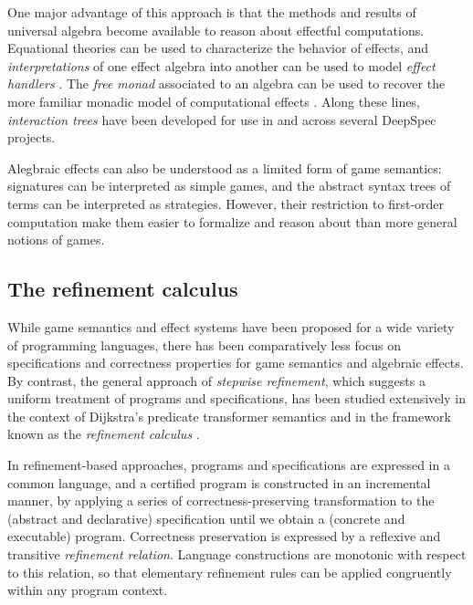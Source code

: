 \documentclass[11pt,oneside,draft]{book}
\theoremstyle{definition}
\begin{document}
One major advantage of this approach is that
the methods and results of universal algebra
become available to reason about effectful computations.
Equational theories can be used to characterize
the behavior of effects, and \emph{interpretations}
of one effect algebra into another can be used to model
\emph{effect handlers} \citep{eff}.
The \emph{free monad} associated to an algebra
can be used to recover the more familiar
monadic model of computational effects \citep{monads}.
Along these lines,
\emph{interaction trees} \citep{itree}
have been developed for use in and across
several DeepSpec projects.

Alegbraic effects can also be understood as
a limited form of game semantics:
signatures can be interpreted as simple games,
and the abstract syntax trees of terms
can be interpreted as strategies.
However,
their restriction to first-order computation
make them easier to formalize and reason about
than more general notions of games.



\subsection{The refinement calculus} %

While game semantics
and effect systems
have been proposed
for a wide variety of programming languages,
there has been comparatively less focus
on specifications and correctness properties
for game semantics and algebraic effects.
By contrast,
the general approach of \emph{stepwise refinement},
which suggests a uniform treatment of programs and specifications,
has been studied extensively in the context of
Dijkstra's predicate transformer semantics \citep{gc}
and in the framework known as the \emph{refinement calculus} \citep{refcal}.

In refinement-based approaches,
programs and specifications are expressed in a common language,
and a certified program is constructed in an incremental manner,
by applying a series of correctness-preserving transformation
to the (abstract and declarative) specification
until we obtain a (concrete and executable) program.
Correctness preservation is expressed
by a reflexive and transitive \emph{refinement relation}.
Language constructions are monotonic with respect to this relation,
so that elementary refinement rules
can be applied congruently within any program context.
\end{document}
